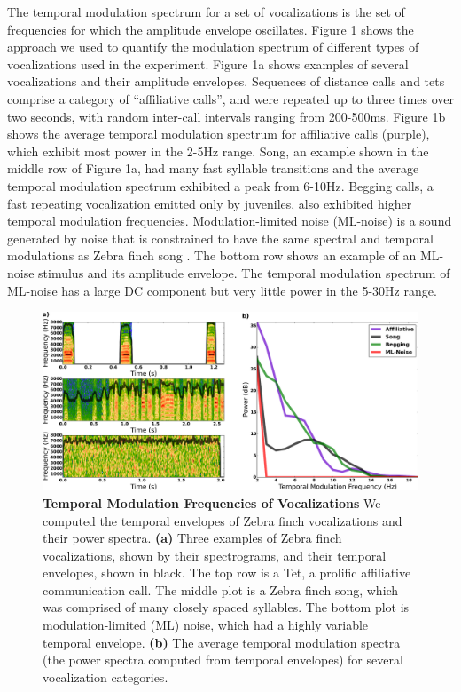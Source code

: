 The temporal modulation spectrum for a set of vocalizations is the set of frequencies for which the amplitude envelope oscillates. Figure 1 shows the approach we used to quantify the modulation spectrum of different types of vocalizations used in the experiment. Figure 1a shows examples of several vocalizations and their amplitude envelopes. Sequences of distance calls and tets comprise a category of ``affiliative calls'', and were repeated up to three times over two seconds, with random inter-call intervals ranging from 200-500ms. Figure 1b shows the average temporal modulation spectrum for affiliative calls (purple), which exhibit most power in the 2-5Hz range. Song, an example shown in the middle row of Figure 1a, had many fast syllable transitions and the average temporal modulation spectrum exhibited a peak from 6-10Hz. Begging calls, a fast repeating vocalization emitted only by juveniles, also exhibited higher temporal modulation frequencies. Modulation-limited noise (ML-noise) is a sound generated by noise that is constrained to have the same spectral and temporal modulations as Zebra finch song \cite{Hsu2004b}. The bottom row shows an example of an ML-noise stimulus and its amplitude envelope. The temporal modulation spectrum of ML-noise has a large DC component but very little power in the 5-30Hz range.

\begin{figure}
    \caption{\textbf{Temporal Modulation Frequencies of Vocalizations} We computed the temporal envelopes of Zebra finch vocalizations and their power spectra. \textbf{(a)} Three examples of Zebra finch vocalizations, shown by their spectrograms, and their temporal envelopes, shown in black. The top row is a Tet, a prolific affiliative communication call. The middle plot is a Zebra finch song, which was comprised of many closely spaced syllables. The bottom plot is modulation-limited (ML) noise, which had a highly variable temporal envelope. \textbf{(b)} The average temporal modulation spectra (the power spectra computed from temporal envelopes) for several vocalization categories.}
    \centering
    \includegraphics[scale=0.25]{figure_2_1.eps}
\end{figure}


